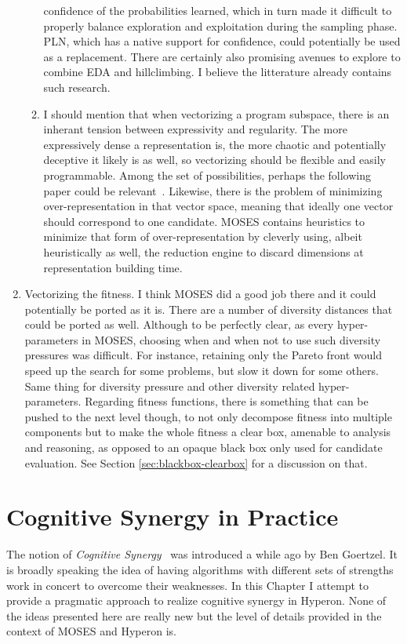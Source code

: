 \documentclass[]{report}
\begin{document}
\begin{enumerate}
\begin{enumerate}
  confidence of the probabilities learned, which in turn made it
  difficult to properly balance exploration and exploitation during
  the sampling phase.  PLN, which has a native support for confidence,
  could potentially be used as a replacement.  There are certainly
  also promising avenues to explore to combine EDA and hillclimbing.
  I believe the litterature already contains such research.
\item I should mention that when vectorizing a program subspace, there
  is an inherant tension between expressivity and regularity.  The
  more expressively dense a representation is, the more chaotic and
  potentially deceptive it likely is as well, so vectorizing should be
  flexible and easily programmable.  Among the set of possibilities,
  perhaps the following paper could be relevant~\cite{Alon2019}.
  Likewise, there is the problem of minimizing over-representation in
  that vector space, meaning that ideally one vector should correspond
  to one candidate.  MOSES contains heuristics to minimize that form
  of over-representation by cleverly using, albeit heuristically as
  well, the reduction engine to discard dimensions at representation
  building time.
\end{enumerate}
\item Vectorizing the fitness.  I think MOSES did a good job there and
  it could potentially be ported as it is.  There are a number of
  diversity distances that could be ported as well.  Although to be
  perfectly clear, as every hyper-parameters in MOSES, choosing when
  and when not to use such diversity pressures was difficult.  For
  instance, retaining only the Pareto front would speed up the search
  for some problems, but slow it down for some others.  Same thing for
  diversity pressure and other diversity related hyper-parameters.
  Regarding fitness functions, there is something that can be pushed
  to the next level though, to not only decompose fitness into
  multiple components but to make the whole fitness a clear box,
  amenable to analysis and reasoning, as opposed to an opaque black
  box only used for candidate evaluation.  See Section
  \ref{sec:blackbox-clearbox} for a discussion on that.
\end{enumerate}

\chapter{Cognitive Synergy in Practice}
\label{chap:cogsyn}

The notion of \emph{Cognitive Synergy}~\cite{Goertzel2017} was
introduced a while ago by Ben Goertzel.  It is broadly speaking the
idea of having algorithms with different sets of strengths work in
concert to overcome their weaknesses.  In this Chapter I attempt to
provide a pragmatic approach to realize cognitive synergy in Hyperon.
None of the ideas presented here are really new but the level of
details provided in the context of MOSES and Hyperon is.
\end{document}
